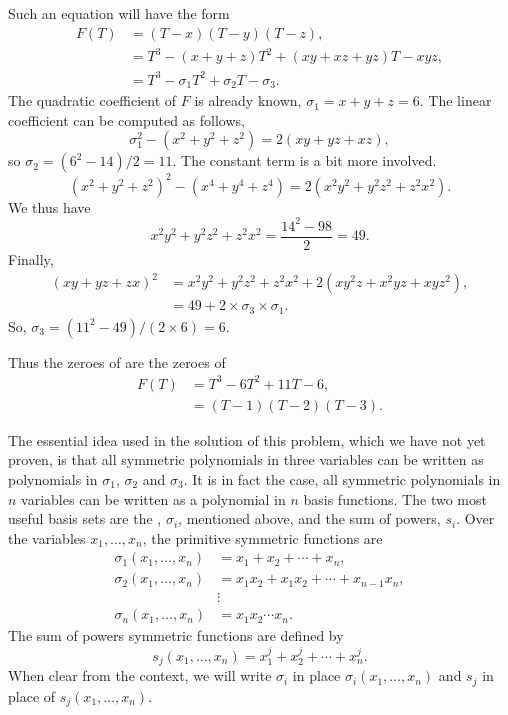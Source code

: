 Such an equation will have the form
\[
\begin{aligned}
F(T) & = (T - x) (T - y) (T - z), \\
  &= T^3 - (x + y + z) T^2 + (xy + xz +yz) T - xyz,\\
  &= T^3 - \sigma_1 T^2 + \sigma_2 T - \sigma_3.
\end{aligned}
\]
The quadratic coefficient of $F$ is already known, $\sigma_1 = x+y+z =
6$.  The linear coefficient can be computed as follows,
\[
\sigma_1^2 -(x^2 + y^2 +z^2) = 2(xy + yz +xz),
\]
so $\sigma_2 = (6^2 - 14)/2 = 11$.  The constant term is a bit more
involved.  
\[
(x^2 + y^2 + z^2)^2 - (x^4 + y^4 + z^4) = 2(x^2 y^2 + y^2 z^2 + z^2x^2).
\]
We thus have
\[
x^2 y^2 + y^2 z^2 + z^2x^2 = \frac{14^2 - 98}{2} = 49.
\]
Finally,
\[
\begin{aligned}
(xy + yz +zx)^2 &= x^2 y^2 + y^2 z^2 + z^2 x^2 + 2(xy^2z + x^2 y z + xyz^2),\\
  & = 49 + 2 \times \sigma_3 \times \sigma_1.
\end{aligned}
\]
So, $\sigma_3 = (11^2 - 49)/(2 \times 6) = 6$.

Thus the zeroes of  are the zeroes of 
\[
\begin{aligned}
 F(T) & = T^3 - 6 T^2 + 11 T - 6,\\
      & = (T - 1) (T - 2) (T - 3).
\end{aligned}
\]

The essential idea used in the solution of this problem, which we have
not yet proven, is that all symmetric polynomials in three variables
can be written as polynomials in $\sigma_1$, $\sigma_2$ and
$\sigma_3$.  It is in fact the case, all symmetric polynomials in $n$
variables can be written as a polynomial in $n$ basis functions.
The two most useful basis sets are the , $\sigma_i$, mentioned above, and the sum of powers, $s_i$.
Over the variables $x_1, \ldots, x_n$, the primitive symmetric
functions are
\[
\begin{aligned}
\sigma_1(x_1, \ldots, x_n) &= x_1 + x_2 + \cdots + x_n, \\
\sigma_2(x_1, \ldots, x_n) &= x_1 x_2 + x_1 x_2 + \cdots + x_{n-1} x_n, \\
  & \vdots \\
\sigma_n(x_1, \ldots, x_n) &= x_1 x_2 \cdots x_n.
\end{aligned}
\]
The sum of powers symmetric functions are defined by 
\[
s_j(x_1, \ldots, x_n) = x_1^j + x_2^j + \cdots + x_n^j.
\]
When clear from the context, we will write $\sigma_i$ in place
$\sigma_i(x_1, \ldots, x_n)$ and $s_j$ in place of $s_j(x_1, \ldots,
x_n)$.

